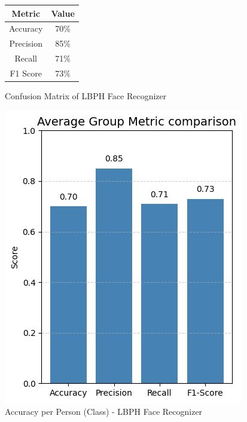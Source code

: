 \documentclass[openany]{report}
\begin{document}
\begin{figure}[H]
    \centering
    \begin{minipage}{0.48\textwidth}
        \centering
        \begin{tabular}{|c|c|}
            \hline
            \textbf{Metric} & \textbf{Value} \\ 
            \hline
            Accuracy        & 70\%           \\ 
            \hline
            Precision       & 85\%           \\ 
            \hline
            Recall          & 71\%           \\ 
            \hline
            F1 Score        & 73\%         \\ 
            \hline
        \end{tabular}
        \caption{Confusion Matrix of LBPH Face Recognizer}
        \label{tab:confusion-metrics}
    \end{minipage}
    \hfill
    \begin{minipage}{0.48\textwidth}
        \centering
        \includegraphics[width=\textwidth]{../imgs/model_1_cm.jpg}
        \caption{Accuracy per Person (Class) - LBPH Face Recognizer}
        \label{fig:confusion-matrix}
    \end{minipage}
\end{figure}
\end{document}
